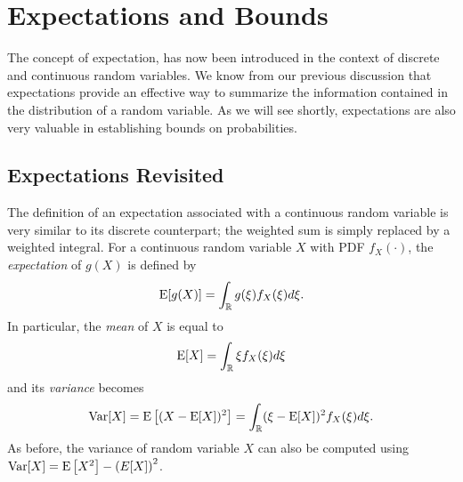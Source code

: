 \chapter{Expectations and Bounds}

The concept of expectation, has now been introduced in the context of discrete and continuous random variables.
We know from our previous discussion that expectations provide an effective way to summarize the information contained in the distribution of a random variable.
As we will see shortly, expectations are also very valuable in establishing bounds on probabilities.

\iffalse

\section{Expectations Revisited}

The definition of an expectation associated with a continuous random variable is very similar to its discrete counterpart;
the weighted sum is simply replaced by a weighted integral.
For a continuous random variable $X$ with PDF $f_X(\cdot)$, the \emph{expectation} of $g(X)$ is defined by 
\begin{equation*}
\mathrm{E} [g(X)]
= \int_{\mathbb{R}} g(\xi) f_X (\xi) d\xi .
\end{equation*}
In particular, the \emph{mean} of $X$ is equal to 
\begin{equation*}
\mathrm{E} [X]
= \int_{\mathbb{R}} \xi f_X (\xi) d\xi
\end{equation*}
and its \emph{variance} becomes 
\begin{equation*}
\mathrm{Var} [X] = \mathrm{E} \left[ (X - \mathrm{E}[X])^2 \right]
= \int_{\mathbb{R}} (\xi - \mathrm{E}[X])^2 f_X (\xi) d\xi .
\end{equation*}
As before, the variance of random variable $X$ can also be computed using $\mathrm{Var} [X] = \mathrm{E} \left[ X^2 \right] - \left( E[X] \right)^2$.

